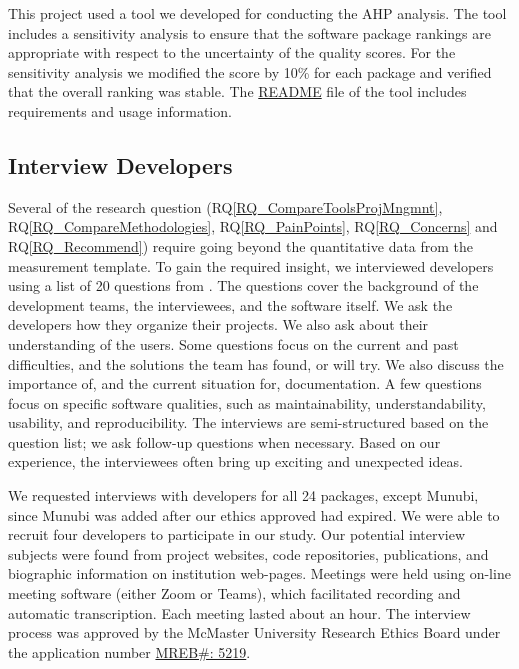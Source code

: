 \documentclass[final, 3p, times, authoryear]{elsarticle}
\newcommand{\rqref}[1]{RQ\ref{#1}}
\begin{document}
This project used a tool we developed for conducting the AHP analysis. The tool
includes a sensitivity analysis to ensure that the software package rankings are
appropriate with respect to the uncertainty of the quality scores. For the
sensitivity analysis we modified the score by 10\% for each package and verified
that the overall ranking was stable.  The
\href{https://github.com/smiths/AIMSS/blob/master/StateOfPractice/AHP2020/LBM/README.txt}{README}
file of the tool includes requirements and usage information.

\subsection{Interview Developers} \label{SecSurvey}

Several of the research question (\rqref{RQ_CompareToolsProjMngmnt},
\rqref{RQ_CompareMethodologies}, \rqref{RQ_PainPoints}, \rqref{RQ_Concerns} and
\rqref{RQ_Recommend}) require going beyond the quantitative data from the
measurement template. To gain the required insight, we interviewed developers
using a list of 20 questions from \citet{SmithEtAl2021}. The questions cover the
background of the development teams, the interviewees, and the software itself.
We ask the developers how they organize their projects. We also ask about their
understanding of the users. Some questions focus on the current and past
difficulties, and the solutions the team has found, or will try. We also discuss
the importance of, and the current situation for, documentation. A few questions
focus on specific software qualities, such as maintainability,
understandability, usability, and reproducibility. The interviews are
semi-structured based on the question list; we ask follow-up questions when
necessary. Based on our experience, the interviewees often bring up exciting and
unexpected ideas.

We requested interviews with developers for all 24 packages, except Munubi,
since Munubi was added after our ethics approved had expired.  We were able to
recruit four developers to participate in our study.  Our potential interview
subjects were found from project websites, code repositories, publications, and
biographic information on institution web-pages. Meetings were held using
on-line meeting software (either Zoom or Teams), which facilitated recording and
automatic transcription.  Each meeting lasted about an hour. The interview
process was approved by the McMaster University Research Ethics Board under the
application number 
\href{https://github.com/smiths/AIMSS/blob/master/StateOfPractice/MACREM/Application.pdf}
{MREB\#: 5219}.
\end{document}
